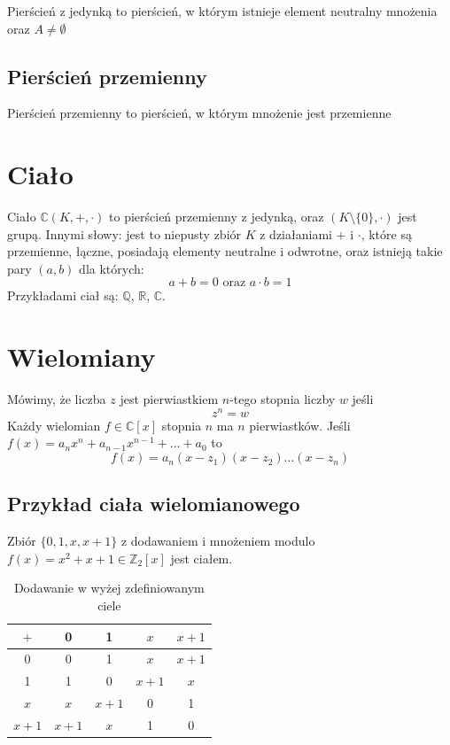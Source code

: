 \documentclass{../notatki}
\begin{document}
Pierścień z jedynką to pierścień, w którym istnieje element neutralny
mnożenia oraz $A \ne \emptyset$

\subsection{Pierścień przemienny}

Pierścień przemienny to pierścień, w którym mnożenie jest przemienne

\section{Ciało}

Ciało $\mathbb{C}(K, +, \cdot)$ to pierścień przemienny z jedynką, oraz $(K
\setminus \{0\}, \cdot)$ jest grupą.
Innymi słowy: jest to niepusty zbiór $K$ z działaniami $+$ i $\cdot$, które
są przemienne, łączne, posiadają elementy neutralne i odwrotne, oraz
istnieją takie pary $(a, b)$ dla których:
$$
a + b = 0 \text{ oraz } a \cdot b = 1
$$
Przykładami ciał są: $\mathbb{Q}$, $\mathbb{R}$, $\mathbb{C}$.

\section{Wielomiany}

Mówimy, że liczba $z$ jest pierwiastkiem $n$-tego stopnia liczby $w$ jeśli
$$
z^n = w
$$
Każdy wielomian $f \in \mathbb{C}[x]$ stopnia $n$ ma $n$
pierwiastków. Jeśli $f(x) = a_n x^n + a_{n-1} x^{n-1} + \dots + a_0$ to
$$
f(x) = a_n (x - z_1)(x - z_2) \dots (x - z_n)
$$

\subsection{Przykład ciała wielomianowego}

Zbiór $\{0, 1, x, x+1\}$ z dodawaniem i mnożeniem modulo $f(x) = x^2
+ x + 1 \in \mathbb{Z}_2[x]$ jest ciałem.

\begin{table}[h]
  \centering
  \begin{tabular}{c|cccc}
    \hline
    $+$ & 0 & 1 & $x$ & $x + 1$ \\
    \hline
    0 & 0 & 1 & $x$ & $x + 1$ \\
    1 & 1 & 0 & $x + 1$ & $x$ \\
    $x$ & $x$ & $x + 1$ & 0 & 1 \\
    $x + 1$ & $x + 1$ & $x$ & 1 & 0 \\
    \hline
  \end{tabular}
  \caption{Dodawanie w wyżej zdefiniowanym ciele}
\end{table}
\end{document}
